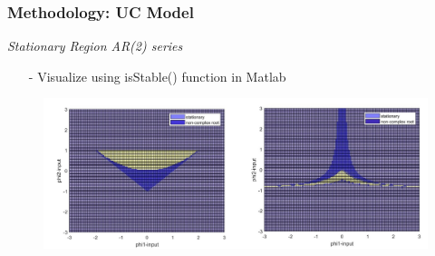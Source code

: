 \documentclass[10pt]{beamer}
\begin{document}
\begin{frame}
	\frametitle{Methodology: UC Model}
	\textit{Stationary Region AR(2) series}
	\begin{itemize}
		\item[-] Visualize using isStable() function in Matlab
	\end{itemize}

	
	\begin{figure}[H]
		\begin{minipage}{0.95\textwidth} %
			\includegraphics[scale=0.5]{stationary1.jpg}
		\end{minipage}
	\end{figure}
		
\end{frame}
 
\end{document}
